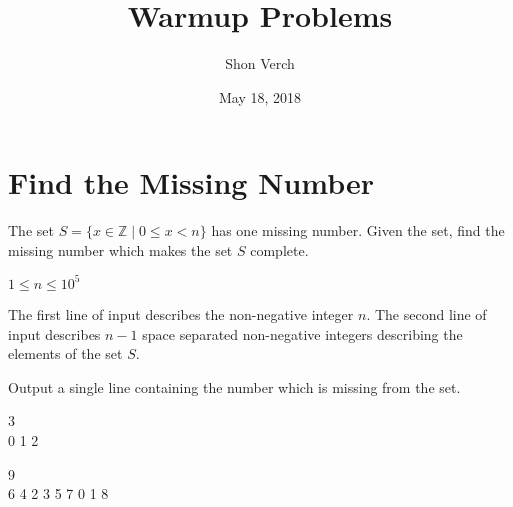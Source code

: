 \documentclass{problem-set}
\title{Warmup Problems}
\date{May 18, 2018}
\author{Shon Verch}
\begin{document}
\maketitle

\section{Find the Missing Number}
The set $S = \{x \in \mathbb{Z} \mid 0 \le x < n\}$ has one missing number. Given the set, find the missing number which makes the set $S$ complete.

\constraints
$1 \leq n \leq 10^5$

The first line of input describes the non-negative integer $n$. The second line of input describes $n-1$ space separated non-negative integers describing the elements of the set $S$.

\outputformat
Output a single line containing the number which is missing from the set.

\vspace{1em}

\addsample
{
3\\
0 1
}
{
2
}

\pushnewpage

\addsample
{
9\\
6 4 2 3 5 7 0 1
}
{
8
}
\end{document}
